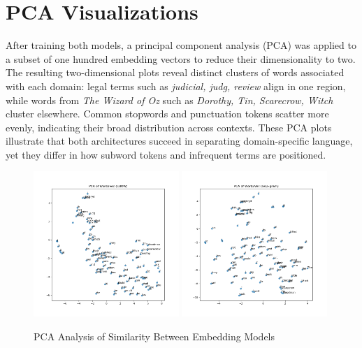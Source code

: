 \documentclass[12pt]{article}
\begin{document}
\section*{PCA Visualizations}
After training both models, a principal component analysis (PCA) was applied to a subset of one hundred embedding vectors to reduce their dimensionality to two. The resulting two-dimensional plots reveal distinct clusters of words associated with each domain: legal terms such as \emph{judicial, judg, review} align in one region, while words from \emph{The Wizard of Oz} such as \emph{Dorothy, Tin, Scarecrow, Witch} cluster elsewhere. Common stopwords and punctuation tokens scatter more evenly, indicating their broad distribution across contexts. These PCA plots illustrate that both architectures succeed in separating domain-specific language, yet they differ in how subword tokens and infrequent terms are positioned.
\begin{figure}[ht]
    \centering
    \includegraphics[width=0.49\textwidth]{cbow.png}
    \hfill
    \includegraphics[width=0.49\textwidth]{skip-gram.png}
    \caption{PCA Analysis of Similarity Between Embedding Models}
    \label{fig:two-images-side-by-side}
\end{figure}
\end{document}

